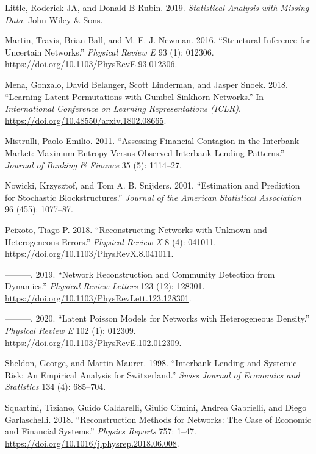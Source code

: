 \documentclass[
  a4paper,
]{article}
\newlength{\cslhangindent}
\newenvironment{CSLReferences}[2] %
 {\begin{list}{}{%
  \setlength{\itemindent}{0pt}
  \setlength{\leftmargin}{0pt}
  \setlength{\parsep}{0pt}
  \ifodd #1
   \setlength{\leftmargin}{\cslhangindent}
   \setlength{\itemindent}{-1\cslhangindent}
  \fi
  \setlength{\itemsep}{#2\baselineskip}}}
 {\end{list}}
\begin{document}
\begin{CSLReferences}{1}{0}
Little, Roderick JA, and Donald B Rubin. 2019. \emph{Statistical
Analysis with Missing Data}. John Wiley \& Sons.

Martin, Travis, Brian Ball, and M. E. J. Newman. 2016. {``Structural
Inference for Uncertain Networks.''} \emph{Physical Review E} 93 (1):
012306. \url{https://doi.org/10.1103/PhysRevE.93.012306}.

Mena, Gonzalo, David Belanger, Scott Linderman, and Jasper Snoek. 2018.
{``Learning Latent Permutations with {Gumbel-Sinkhorn} Networks.''} In
\emph{International Conference on Learning Representations (ICLR)}.
\url{https://doi.org/10.48550/arxiv.1802.08665}.

Mistrulli, Paolo Emilio. 2011. {``Assessing Financial Contagion in the
Interbank Market: Maximum Entropy Versus Observed Interbank Lending
Patterns.''} \emph{Journal of Banking \& Finance} 35 (5): 1114--27.

Nowicki, Krzysztof, and Tom A. B. Snijders. 2001. {``Estimation and
Prediction for Stochastic Blockstructures.''} \emph{Journal of the
American Statistical Association} 96 (455): 1077--87.

Peixoto, Tiago P. 2018. {``Reconstructing Networks with Unknown and
Heterogeneous Errors.''} \emph{Physical Review X} 8 (4): 041011.
\url{https://doi.org/10.1103/PhysRevX.8.041011}.

---------. 2019. {``Network Reconstruction and Community Detection from
Dynamics.''} \emph{Physical Review Letters} 123 (12): 128301.
\url{https://doi.org/10.1103/PhysRevLett.123.128301}.

---------. 2020. {``Latent Poisson Models for Networks with
Heterogeneous Density.''} \emph{Physical Review E} 102 (1): 012309.
\url{https://doi.org/10.1103/PhysRevE.102.012309}.

Sheldon, George, and Martin Maurer. 1998. {``Interbank Lending and
Systemic Risk: An Empirical Analysis for {Switzerland}.''} \emph{Swiss
Journal of Economics and Statistics} 134 (4): 685--704.

Squartini, Tiziano, Guido Caldarelli, Giulio Cimini, Andrea Gabrielli,
and Diego Garlaschelli. 2018. {``Reconstruction Methods for Networks:
The Case of Economic and Financial Systems.''} \emph{Physics Reports}
757: 1--47. \url{https://doi.org/10.1016/j.physrep.2018.06.008}.


\end{CSLReferences}
\end{document}
